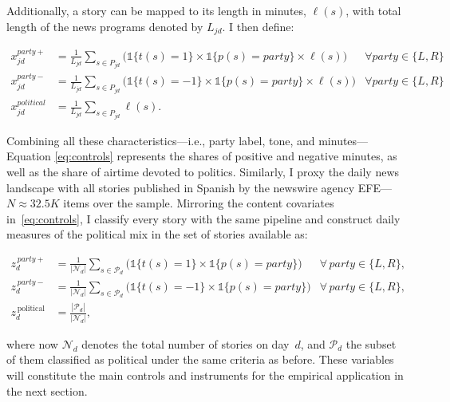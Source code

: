 \documentclass[12pt]{article}
\begin{document}
	
	Additionally, a story can be mapped to its length in minutes, \( \ell(s)\), with total length of the news programs  denoted by $L_{jd}$. I then define: 
	
	
	


		\begin{equation}\label{eq:controls}
		\begin{aligned}
			x_{jd}^{party+}&= \frac{1}{L_{jd}} \sum_{s \in P_{jd}}\bigg(\mathds{1}\{t(s)=1\} \times \mathds{1}\{p(s)=party\}\times \ell(s) \bigg) &\forall party \in \{L,R\} \\
			x_{jd}^{party-}&= \frac{1}{L_{jd}} \sum_{s \in P_{jd}}\bigg( \mathds{1}\{t(s)=-1\} \times \mathds{1}\{p(s)=party\} \times \ell(s)\bigg) &\forall party \in \{L,R\} \\
			x_{jd}^{political}&=\frac{1}{L_{jd}} \sum_{s \in P_{jd}}\ell(s).
		\end{aligned}
	\end{equation} 
	

 Combining all these characteristics—i.e., party label, tone, and minutes— Equation \eqref{eq:controls} represents the  shares of positive and negative minutes, as well as the share of airtime devoted to politics.	Similarly, I proxy the daily news landscape with all stories published in Spanish by the newswire agency EFE—$N\approx32.5K$ items over the sample. Mirroring the content covariates in~\eqref{eq:controls}, I classify every  story with the same pipeline and construct daily measures of the political mix in the set of stories available as:
	
	\begin{equation}\label{eq:efe}
		\begin{aligned}
			z_d^{\,party+} &= \frac{1}{|\mathcal{N}_d|}\sum_{s\in \mathcal{P}_d}
			\bigg(\mathds{1}\{t(s)=1\}\times \mathds{1}\{p(s)=\textit{party}\}\bigg)
			&\forall\,\textit{party}\in\{L,R\},\\
			z_d^{\,party-} &= \frac{1}{|\mathcal{N}_d|}\sum_{s\in \mathcal{P}_d}
			\bigg(\mathds{1}\{t(s)=-1\}\times \mathds{1}\{p(s)=\textit{party}\}\bigg)
			&\forall\,\textit{party}\in\{L,R\},\\
			z_d^{\,\text{political}} &= \frac{|\mathcal{P}_d|}{|\mathcal{N}_d|},
		\end{aligned}
	\end{equation}
	
	where now \(\mathcal{N}_d\) denotes the total number of   stories on day~\(d\), and \(\mathcal{P}_d\) the subset of them classified as political under the same criteria as before. These variables will constitute the main controls and instruments for the empirical application in the next section. 
	
\end{document}
